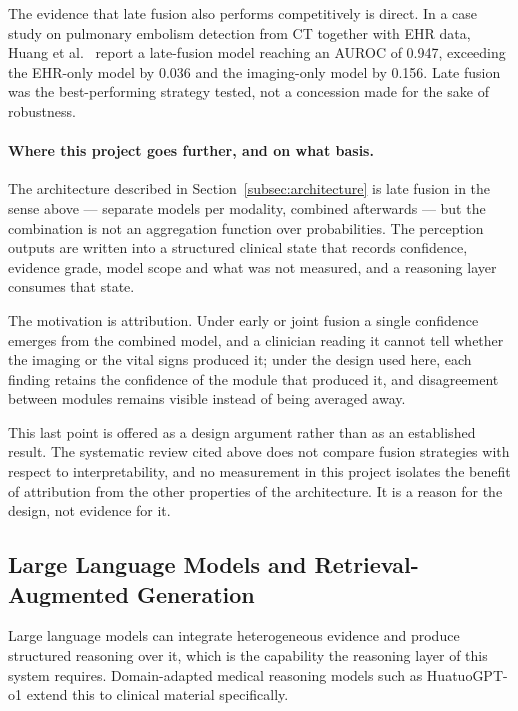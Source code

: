 The evidence that late fusion also performs competitively is direct. In a case study on
pulmonary embolism detection from CT together with EHR data, Huang et al.\
\cite{huang2020pe} report a late-fusion model reaching an AUROC of 0.947, exceeding the
EHR-only model by 0.036 and the imaging-only model by 0.156. Late fusion was the
best-performing strategy tested, not a concession made for the sake of robustness.

\paragraph{Where this project goes further, and on what basis.} The architecture described
in Section~\ref{subsec:architecture} is late fusion in the sense above --- separate models
per modality, combined afterwards --- but the combination is not an aggregation function
over probabilities. The perception outputs are written into a structured clinical state
that records confidence, evidence grade, model scope and what was not measured, and a
reasoning layer consumes that state.

The motivation is attribution. Under early or joint fusion a single confidence emerges from
the combined model, and a clinician reading it cannot tell whether the imaging or the vital
signs produced it; under the design used here, each finding retains the confidence of the
module that produced it, and disagreement between modules remains visible instead of being
averaged away.

This last point is offered as a design argument rather than as an established result. The
systematic review cited above does not compare fusion strategies with respect to
interpretability, and no measurement in this project isolates the benefit of attribution
from the other properties of the architecture. It is a reason for the design, not evidence
for it.

\subsection{Large Language Models and Retrieval-Augmented Generation}
\label{subsec:sota-llm}

Large language models can integrate heterogeneous evidence and produce structured reasoning
over it, which is the capability the reasoning layer of this system requires. Domain-adapted
medical reasoning models such as HuatuoGPT-o1 \cite{chen2024huatuogpto1} extend this to
clinical material specifically.

